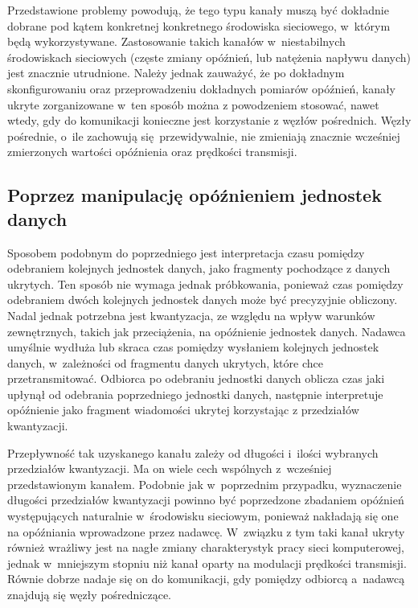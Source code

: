 \documentclass[a4paper, twoside, 12pt]{report}
\begin{document}
        Przedstawione problemy powodują, że tego typu kanały muszą być dokładnie
        dobrane pod kątem konkretnej konkretnego środowiska sieciowego, w~którym będą wykorzystywane.
        Zastosowanie takich kanałów w~niestabilnych środowiskach sieciowych (częste zmiany
        opóźnień, lub natężenia napływu danych) jest znacznie utrudnione. Należy jednak
        zauważyć, że po dokładnym skonfigurowaniu oraz przeprowadzeniu dokładnych
        pomiarów opóźnień, kanały ukryte zorganizowane w~ten sposób można z powodzeniem
        stosować, nawet wtedy, gdy do komunikacji konieczne jest korzystanie z węzłów pośrednich.
        Węzły pośrednie, o~ile zachowują się przewidywalnie, nie zmieniają znacznie wcześniej
        zmierzonych wartości opóźnienia oraz prędkości transmisji.

        \subsection{Poprzez manipulację opóźnieniem jednostek danych}
        Sposobem podobnym do poprzedniego jest interpretacja czasu pomiędzy odebraniem kolejnych jednostek danych,
        jako fragmenty pochodzące z danych ukrytych\cite{IPDELAYCHANNEL}. Ten sposób nie wymaga jednak próbkowania,
        ponieważ czas pomiędzy odebraniem dwóch kolejnych jednostek danych
        może być precyzyjnie obliczony. Nadal jednak potrzebna
        jest kwantyzacja, ze względu na wpływ warunków zewnętrznych, takich jak przeciążenia,
        na opóźnienie jednostek danych. Nadawca umyślnie wydłuża lub skraca czas pomiędzy
        wysłaniem kolejnych jednostek danych, w~zależności od fragmentu danych ukrytych,
        które chce przetransmitować. Odbiorca po odebraniu jednostki danych oblicza czas jaki
        upłynął od odebrania poprzedniego jednostki danych, następnie
        interpretuje opóźnienie jako fragment wiadomości ukrytej korzystając z
        przedziałów kwantyzacji.

        Przepływność tak uzyskanego kanału zależy od długości i~ilości wybranych
        przedziałów kwantyzacji. Ma on wiele cech wspólnych z~wcześniej przedstawionym
        kanałem. Podobnie jak w~poprzednim przypadku, wyznaczenie długości
        przedziałów kwantyzacji powinno być poprzedzone zbadaniem opóźnień występujących
        naturalnie w~środowisku sieciowym, ponieważ nakładają się one na opóźniania
        wprowadzone przez nadawcę. W~związku z tym taki kanał ukryty również wrażliwy jest
        na nagłe zmiany charakterystyk pracy sieci komputerowej, jednak w~mniejszym
        stopniu niż kanał oparty na modulacji prędkości transmisji. Równie dobrze
        nadaje się on do komunikacji, gdy pomiędzy odbiorcą a~nadawcą znajdują się
        węzły pośredniczące.
\end{document}

